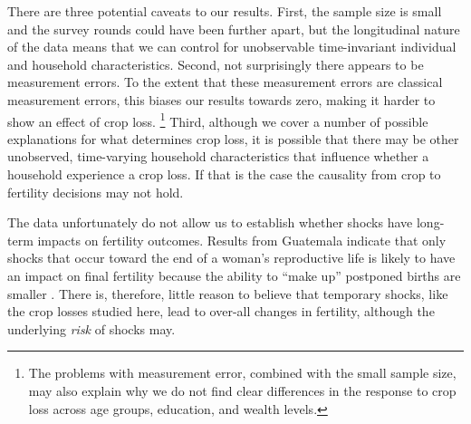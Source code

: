 \documentclass[letterpaper,12pt]{article}
\begin{document}
There are three potential caveats to our results.
First, the sample size is small and the survey rounds
could have been further apart, but the longitudinal nature
of the data means that we can control for unobservable 
time-invariant individual and household characteristics.
Second, not surprisingly there appears to be measurement 
errors.
To the extent that these measurement errors are classical 
measurement errors, this biases our results towards zero,
making it harder to show an effect of crop loss.%
\footnote{
The problems with measurement error, combined with the small
sample size, may also explain why we do not find clear
differences in the response to crop loss across age groups,
education, and wealth levels.
}
Third, although we cover a number of possible explanations
for what determines crop loss, it is possible that there may 
be other unobserved, time-varying household characteristics 
that influence whether a household experience a crop loss.
If that is the case the causality from crop to fertility decisions
may not hold.


The data unfortunately do not allow us to establish whether shocks
have long-term impacts on fertility outcomes.
Results from Guatemala indicate that only shocks that occur 
toward the end of a woman's reproductive life is likely to have an 
impact on final fertility because the ability to ``make up'' 
postponed births are smaller \citep{Portner2014}.
There is, therefore, little reason to believe that temporary shocks,
like the crop losses studied here, lead to over-all changes in fertility,
although the underlying \emph{risk} of shocks may. 
\end{document}

